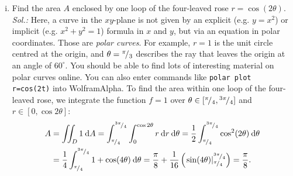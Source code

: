 \begin{example}
\begin{enumerate}[(i)]
	\item Find the area $A$ enclosed by one loop of the four-leaved rose $r=\cos(2\theta)$.\\
	{\it Sol.:} Here, a curve in the $xy$-plane is not given by an explicit (e.g. $y=x^2$) or implicit (e.g. $x^2+y^2=1$) formula in $x$ and $y$, but via an equation in polar coordinates. Those are \emph{polar curves}. For example, $r=1$ is the unit circle centred at the origin, and $\theta = {}^{\pi}\!/_{3}$ describes the ray that leaves the origin at an angle of $60^{\circ}$. You should be able to find lots of interesting material on polar curves online. You can also enter commands like \texttt{polar plot r=cos(2t)} into WolframAlpha. To find the area within one loop of the four-leaved rose,
	we integrate the function $f=1$ over $\theta\in[{}^{\pi}\!/_{4},{}^{3\pi}\!/_{4}]$ and $r\in[0,\cos2\theta]$:
	\begin{equation*}
	\begin{split}
	A & = \iint_D 1 \: \d A 
	= \itgr{\rfrac{\pi}{4}}{\rfrac{3\pi}{4}}{\itgr{0}{\cos 2\theta}{r}{r}}{\theta}
	= \frac12 \itgr{\rfrac{\pi}{4}}{\rfrac{3\pi}{4}}{\cos^2(2\theta)}{\theta} \\
	& = \frac14 \itgr{\rfrac{\pi}{4}}{\rfrac{3\pi}{4}}{1+\cos(4\theta)}{\theta} 
	= \frac{\pi}{8} + \frac{1}{16} \left( \left. \sin(4\theta)
				\right|_{\rfrac{\pi}{4}}^{\rfrac{3\pi}{4}} \right) = \frac{\pi}{8}.	
	\end{split}
	\end{equation*}
\end{enumerate}
\end{example}

